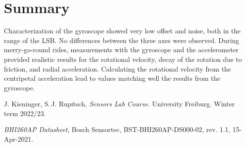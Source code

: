 \documentclass[DIV=14]{scrarticle}
\begin{document}
\section{Summary}
Characterization of the gyroscope showed very low offset and noise, both in the range of the LSB. No differences between the three axes were observed. During merry-go-round rides, measurements with the gyroscope and the accelerometer provided realistic results for the rotational velocity, decay of the rotation due to friction, and radial acceleration. Calculating the rotational velocity from the centripetal acceleration lead to values matching well the results from the gyroscope.


\begin{thebibliography}{------}
 
 J. Kieninger, S.\,J. Rupitsch, \textit{Sensors Lab Course}. University Freiburg. Winter term 2022/23.

 \textit{BHI260AP Datasheet}, Bosch Sensortec, BST-BHI260AP-DS000-02, rev. 1.1, 15-Apr-2021.

\end{thebibliography}
\end{document}
